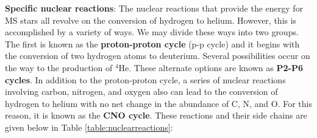 \documentclass[a4paper,10pt]{article}
\begin{document}
{\noindent}\textbf{Specific nuclear reactions}: The nuclear reactions that provide the energy for MS stars all revolve on the conversion of hydrogen to helium. However, this is accomplished by a variety of ways. We may divide these ways into two groups. The first is known as the \textbf{proton-proton cycle} (p-p cycle) and it begins with the conversion of two hydrogen atoms to deuterium. Several possibilities occur on the way to the production of $^4$He. These alternate options are known as \textbf{P2-P6 cycles}. In addition to the proton-proton cycle, a series of nuclear reactions involving carbon, nitrogen, and oxygen also can lead to the conversion of hydrogen to helium with no net change in the abundance of C, N, and O. For this reason, it is known as the \textbf{CNO cycle}. These reactions and their side chains are given below in Table \ref{table:nuclearreactions}:
\end{document}
